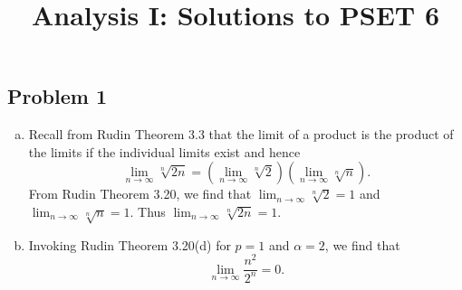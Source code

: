 \documentclass{../mathnotes}
\title{Analysis I: Solutions to PSET 6}
\author{}
\date{}
\begin{document}
\maketitle

\subsection*{Problem 1}
\begin{enumerate}[(a)]
    \item Recall from Rudin Theorem 3.3 that the limit of a product is the product of the limits
        if the individual limits exist and hence
        \[\lim_{n\to\infty}\sqrt[n]{2n}=\left( \lim_{n\to\infty}\sqrt[n]{2} \right)\left( \lim_{n\to\infty}\sqrt[n]{n} \right).\]
        From Rudin Theorem 3.20, we find that $\lim_{n\to\infty}\sqrt[n]{2}=1$ and $\lim_{n\to\infty}\sqrt[n]{n}=1$.
        Thus $\lim_{n\to\infty}\sqrt[n]{2n}=1$.
    \item Invoking Rudin Theorem 3.20(d) for $p=1$ and $\alpha=2$, we find that
        \[\lim_{n\to\infty}\frac{n^2}{2^n}=0.\]
\end{enumerate}
\end{document}

